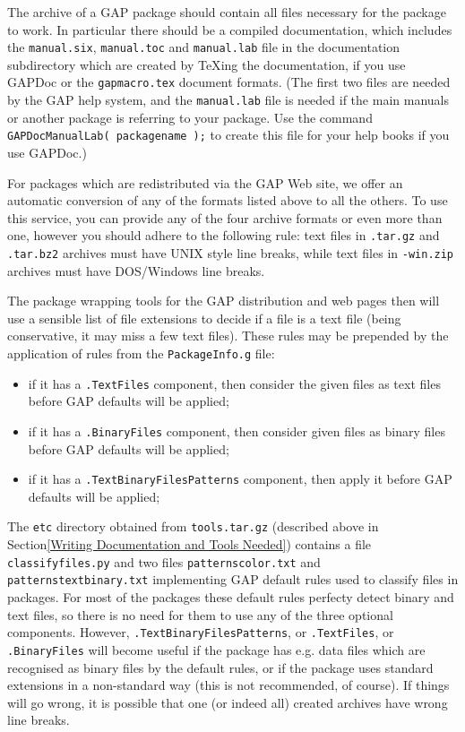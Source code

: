 \documentclass[a4paper,11pt]{report}
\begin{document}
{{  The archive of a \textsf{GAP} package should contain all files necessary for the package to work. In
particular there should be a compiled documentation, which includes the \texttt{manual.six}, \texttt{manual.toc} and \texttt{manual.lab} file in the documentation subdirectory which are created by {\TeX}ing the documentation, if you use \textsf{GAPDoc} or the \texttt{gapmacro.tex} document formats. (The first two files are needed by the \textsf{GAP} help system, and the \texttt{manual.lab} file is needed if the main manuals or another package is referring to your
package. Use the command \texttt{GAPDocManualLab( packagename );} to create this file for your help books if you use \textsf{GAPDoc}.) 

 For packages which are redistributed via the \textsf{GAP} Web site, we offer an automatic conversion of any of the formats listed above
to all the others. To use this service, you can provide any of the four
archive formats or even more than one, however you should adhere to the
following rule: text files in \texttt{.tar.gz} and \texttt{.tar.bz2} archives must have UNIX style line breaks, while text files in \texttt{-win.zip} archives must have DOS/Windows line breaks. 

 The package wrapping tools for the \textsf{GAP} distribution and web pages then will use a sensible list of file extensions to
decide if a file is a text file (being conservative, it may miss a few text
files). These rules may be prepended by the application of rules from the \texttt{PackageInfo.g} file: 
\begin{itemize}
\item  if it has a \texttt{.TextFiles} component, then consider the given files as text files before \textsf{GAP} defaults will be applied; 
\item  if it has a \texttt{.BinaryFiles} component, then consider given files as binary files before \textsf{GAP} defaults will be applied; 
\item  if it has a \texttt{.TextBinaryFilesPatterns} component, then apply it before \textsf{GAP} defaults will be applied; 
\end{itemize}
 

 The \texttt{etc} directory obtained from \texttt{tools.tar.gz} (described above in Section{\nobreakspace}\ref{Writing Documentation and Tools Needed}) contains a file \texttt{classifyfiles.py} and two files \texttt{patternscolor.txt} and \texttt{patternstextbinary.txt} implementing \textsf{GAP} default rules used to classify files in packages. For most of the packages
these default rules perfecty detect binary and text files, so there is no need
for them to use any of the three optional components. However, \texttt{.TextBinaryFilesPatterns}, or \texttt{.TextFiles}, or \texttt{.BinaryFiles} will become useful if the package has e.g. data files which are recognised as
binary files by the default rules, or if the package uses standard extensions
in a non-standard way (this is not recommended, of course). If things will go
wrong, it is possible that one (or indeed all) created archives have wrong
line breaks. 

}}
\end{document}
